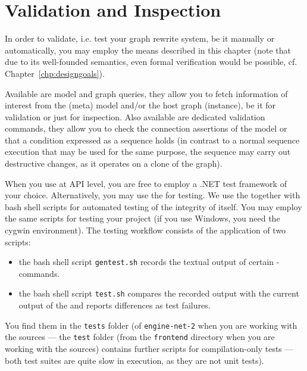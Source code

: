 \chapter{Validation and Inspection}
\label{chapvalidation}

In order to validate, i.e. test your graph rewrite system, be it manually or automatically, you may employ the means described in this chapter (note that due to its well-founded semantics, even formal verification would be possible, cf. Chapter~\ref{chp:designgoals}).

Available are model and graph queries, they allow you to fetch information of interest from the (meta) model and/or the host graph (instance), be it for validation or just for inspection.
Also available are dedicated validation commands, they allow you to check the connection assertions of the model or that a condition expressed as a sequence holds (in contrast to a normal sequence execution that may be used for the same purpose, the sequence may carry out destructive changes, as it operates on a clone of the graph).

When you use \GrG{} at API level, you are free to employ a .NET test framework of your choice.
Alternatively, you may use the \GrShell{} for testing.
We use the \GrShell{} together with bash shell scripts for automated testing of the integrity of \GrG{} itself.
You may employ the same scripts for testing your project (if you use Windows, you need the cygwin environment).
The testing workflow consists of the application of two scripts:
\begin{itemize}
	\item the bash shell script \texttt{gentest.sh} records the textual output of certain \GrShell{}-commands.
	\item the bash shell script \texttt{test.sh} compares the recorded output with the current output of the \GrShell{} and reports differences as test failures.
\end{itemize}
You find them in the \texttt{tests} folder (of \texttt{engine-net-2} when you are working with the sources --- the \texttt{test} folder (from the \texttt{frontend} directory when you are working with the sources) contains further scripts for compilation-only tests --- both test suites are quite slow in execution, as they are not unit tests).


